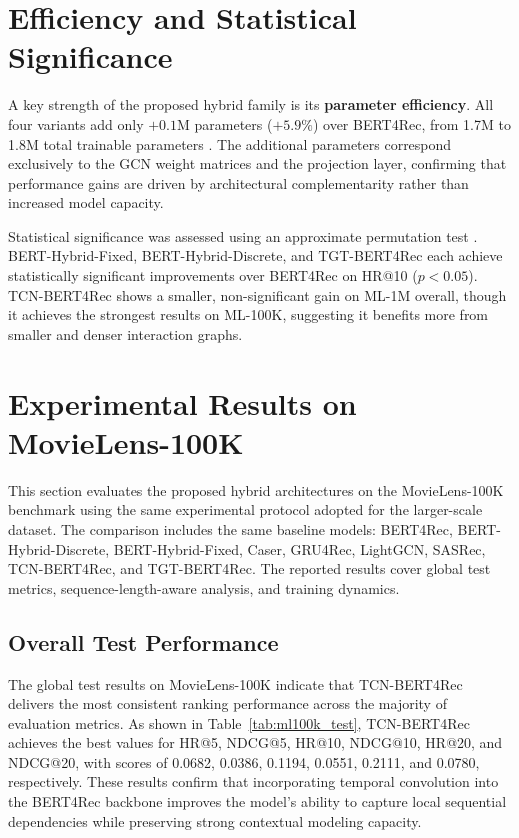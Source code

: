 \documentclass[12pt,a4paper]{report}
\newcommand{\parencite}[1]{\citep{#1}}
\begin{document}
\section{Efficiency and Statistical Significance}

A key strength of the proposed hybrid family is its \textbf{parameter efficiency}. All four variants add only \(+0.1\)M parameters (\(+5.9\%\)) over BERT4Rec, from 1.7M to 1.8M total trainable parameters \parencite{ouledmeriem2025hybrid}. The additional parameters correspond exclusively to the GCN weight matrices and the projection layer, confirming that performance gains are driven by architectural complementarity rather than increased model capacity.

Statistical significance was assessed using an approximate permutation test \parencite{ouledmeriem2025hybrid}. BERT-Hybrid-Fixed, BERT-Hybrid-Discrete, and TGT-BERT4Rec each achieve statistically significant improvements over BERT4Rec on HR@10 (\(p < 0.05\)). TCN-BERT4Rec shows a smaller, non-significant gain on ML-1M overall, though it achieves the strongest results on ML-100K, suggesting it benefits more from smaller and denser interaction graphs.

\section{Experimental Results on MovieLens-100K}

This section evaluates the proposed hybrid architectures on the MovieLens-100K benchmark using the same experimental protocol adopted for the larger-scale dataset. The comparison includes the same baseline models: BERT4Rec, BERT-Hybrid-Discrete, BERT-Hybrid-Fixed, Caser, GRU4Rec, LightGCN, SASRec, TCN-BERT4Rec, and TGT-BERT4Rec. The reported results cover global test metrics, sequence-length-aware analysis, and training dynamics.

\subsection{Overall Test Performance}

The global test results on MovieLens-100K indicate that TCN-BERT4Rec delivers the most consistent ranking performance across the majority of evaluation metrics. As shown in Table~\ref{tab:ml100k_test}, TCN-BERT4Rec achieves the best values for HR@5, NDCG@5, HR@10, NDCG@10, HR@20, and NDCG@20, with scores of 0.0682, 0.0386, 0.1194, 0.0551, 0.2111, and 0.0780, respectively. These results confirm that incorporating temporal convolution into the BERT4Rec backbone improves the model’s ability to capture local sequential dependencies while preserving strong contextual modeling capacity.
\end{document}
